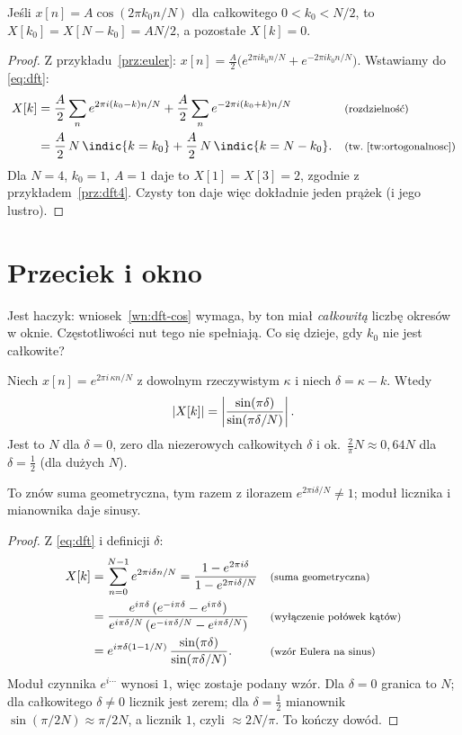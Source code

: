 \begin{wniosek}\label{wn:dft-cos}
Jeśli $x[n]=A\cos(2\pi k_0n/N)$ dla całkowitego $0<k_0<N/2$, to $X[k_0]=X[N-k_0]=AN/2$, a pozostałe $X[k]=0$.
\end{wniosek}
\begin{proof}
Z przykładu~\ref{prz:euler}: $x[n]=\tfrac A2\big(e^{2\pi ik_0n/N}+e^{-2\pi ik_0n/N}\big)$. Wstawiamy do \eqref{eq:dft}:
\begin{align*}
X[k] &= \frac A2\sum_{n}e^{2\pi i(k_0-k)n/N}+\frac A2\sum_{n}e^{-2\pi i(k_0+k)n/N} && \pow{(rozdzielność)}\\
     &= \frac A2\,N\,\indic{k=k_0}+\frac A2\,N\,\indic{k=N-k_0}. && \pow{(tw.~\ref{tw:ortogonalnosc})}
\end{align*}
Dla $N=4$, $k_0=1$, $A=1$ daje to $X[1]=X[3]=2$, zgodnie z przykładem~\ref{prz:dft4}. Czysty ton daje więc dokładnie jeden prążek (i jego lustro).
\end{proof}

\section{Przeciek i okno}

Jest haczyk: wniosek~\ref{wn:dft-cos} wymaga, by ton miał \emph{całkowitą} liczbę okresów w oknie. Częstotliwości
nut tego nie spełniają. Co się dzieje, gdy $k_0$ nie jest całkowite?

\begin{twierdzenie}[Przeciek]\label{tw:przeciek}
Niech $x[n]=e^{2\pi i\,\kappa n/N}$ z dowolnym rzeczywistym $\kappa$ i niech $\delta=\kappa-k$. Wtedy
\begin{equation}
  \left\lvert X[k]\right\rvert=\left|\frac{\sin(\pi\delta)}{\sin(\pi\delta/N)}\right|.
\end{equation}
Jest to $N$ dla $\delta=0$, zero dla niezerowych całkowitych $\delta$ i ok.\ $\frac{2}{\pi}N\approx0{,}64N$ dla $\delta=\tfrac12$
(dla dużych $N$).
\end{twierdzenie}
\begin{pomyslDowodu}
To znów suma geometryczna, tym razem z ilorazem $e^{2\pi i\delta/N}\neq1$; moduł licznika i mianownika daje sinusy.
\end{pomyslDowodu}
\begin{proof}
Z \eqref{eq:dft} i definicji $\delta$:
\begin{align*}
X[k] &= \sum_{n=0}^{N-1}e^{2\pi i\delta n/N}=\frac{1-e^{2\pi i\delta}}{1-e^{2\pi i\delta/N}} && \text{\footnotesize (suma geometryczna)}\\
 &= \frac{e^{i\pi\delta}\,(e^{-i\pi\delta}-e^{i\pi\delta})}{e^{i\pi\delta/N}\,(e^{-i\pi\delta/N}-e^{i\pi\delta/N})} && \text{\footnotesize (wyłączenie połówek kątów)}\\
 &= e^{i\pi\delta(1-1/N)}\,\frac{\sin(\pi\delta)}{\sin(\pi\delta/N)}. && \text{\footnotesize (wzór Eulera na sinus)}
\end{align*}
Moduł czynnika $e^{i\cdots}$ wynosi $1$, więc zostaje podany wzór. Dla $\delta=0$ granica to $N$; dla całkowitego $\delta\neq0$ licznik jest zerem; dla $\delta=\frac12$ mianownik $\sin(\pi/2N)\approx\pi/2N$, a licznik $1$, czyli $\approx2N/\pi$. To kończy dowód.
\end{proof}

